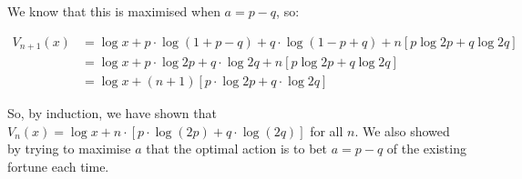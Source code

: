 \documentclass[a4paper]{article}
\begin{document}
\noindent We know that this is maximised when $a = p - q$, so:

\begin{align*}
    V_{n+1}(x) &= \log x + p \cdot \log (1 + p - q) + q \cdot \log (1 - p + q) + n \left[ p \log 2p + q \log 2q \right] \\
    &= \log x + p \cdot \log 2p + q \cdot \log 2q + n \left[ p \log 2p + q \log 2q \right] \\
    &= \log x + (n+1) \left[ p \cdot \log 2p + q \cdot \log 2q \right]
\end{align*}

\noindent So, by induction, we have shown that $V_n(x) = \log x + n \cdot \left[ p \cdot \log(2p) + q \cdot \log(2q) \right]$ for all $n$. We also showed by trying to maximise $a$ that the optimal action is to bet $a = p - q$ of the existing fortune each time.\\
\end{document}
